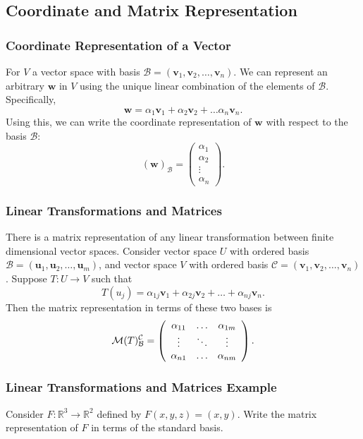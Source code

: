 \documentclass{beamer}
\begin{document}
\subsection{Coordinate and Matrix Representation} 

\begin{frame}
\frametitle{Coordinate Representation of a Vector}
For $V$ a vector space with basis $\mathcal{B} = ({\boldsymbol v_1}, {\boldsymbol  v_2},\ldots, {\boldsymbol  v_n})$. We can represent an arbitrary ${\boldsymbol  w}$ in $V$ using the unique linear combination of the elements of $\mathcal{B}$. Specifically, 
$$
{\boldsymbol  w} = \alpha_1 {\boldsymbol  v_1} + \alpha_2 {\boldsymbol  v_2} +\ldots \alpha_n {\boldsymbol  v_n}.
$$
Using this, we can write the coordinate representation of ${\boldsymbol  w}$ with respect to the basis $\mathcal{B}$:
$$
({\boldsymbol  w})_\mathcal{B} = \left(\begin{array}{c} \alpha_1\\ \alpha_2\\\vdots\\ \alpha_n\end{array}\right).
$$
\end{frame}

\begin{frame}
\frametitle{Linear Transformations and Matrices}
There is a matrix representation of any linear transformation between finite dimensional vector spaces. Consider vector space $U$ with ordered basis $\mathcal{B} = ({\boldsymbol u_1}, {\boldsymbol  u_2},\ldots, {\boldsymbol  u_m})$, and vector space $V$ with ordered basis $\mathcal{C} = ({\boldsymbol  v_1}, {\boldsymbol  v_2},\ldots, {\boldsymbol  v_n})$. Suppose $T: U\to V$ such that
$$
T(u_j) = \alpha_{1 j} {\boldsymbol  v_1} + \alpha_{2 j} {\boldsymbol  v_2} + \ldots + \alpha_{nj} {\boldsymbol  v_n}.
$$
Then the matrix representation in terms of these two bases is
$$
\mathcal{M}(T)_{\mathcal{B}}^{\mathcal{C}} = \left(\begin{array}{c c c c} \alpha_{11}	&	\ldots	&	\alpha_{1m}\\
												
													\vdots	& \ddots	&	\vdots\\
												\alpha_{n1}	&	\ldots	&	\alpha_{nm}\end{array}\right).
$$
\end{frame}

\begin{frame}[t]
\frametitle{Linear Transformations and Matrices Example}
\begin{Example}
Consider $F:\mathbb{R}^3\to \mathbb{R}^2$ defined by $F(x, y, z) = (x, y)$. Write the matrix representation of $F$ in terms of the standard basis.
\end{Example}

\end{frame}
\end{document}
